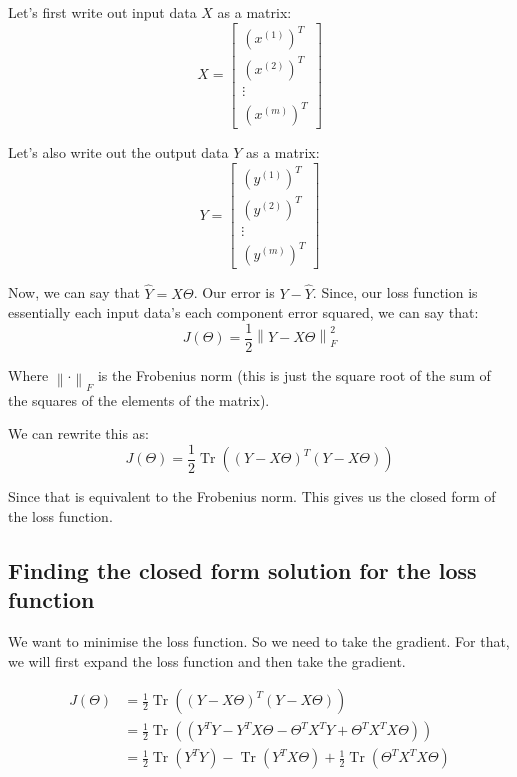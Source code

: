 \documentclass[a4paper]{article}
\DeclareMathOperator{\Tr}{Tr}
\newcommand{\norm}[1]{\left\lVert#1\right\rVert}
\begin{document}
Let's first write out input data $X$ as a matrix:
\begin{equation*}
    X = \begin{bmatrix}
        (x^{(1)})^T \\
        (x^{(2)})^T \\
        \vdots \\
        (x^{(m)})^T
    \end{bmatrix}
\end{equation*}

Let's also write out the output data $Y$ as a matrix:
\begin{equation*}
    Y = \begin{bmatrix}
        (y^{(1)})^T \\
        (y^{(2)})^T \\
        \vdots \\
        (y^{(m)})^T
    \end{bmatrix}
\end{equation*}

Now, we can say that $\hat{Y} = X\Theta$. Our error is $Y - \hat{Y}$. Since, our loss function is essentially each input data's each component error squared, we can say that:
\begin{equation*}
    J(\Theta) = \frac{1}{2} \norm{Y - X\Theta}^2_F
\end{equation*}

Where $\norm{\cdot}_F$ is the Frobenius norm (this is just the square root of the sum of the squares of the elements of the matrix).

We can rewrite this as:
\begin{equation*}
    J(\Theta) = \frac{1}{2} \Tr((Y - X\Theta)^T (Y - X\Theta))
\end{equation*}

Since that is equivalent to the Frobenius norm. This gives us the closed form of the loss function.

\subsection{Finding the closed form solution for the loss function}

We want to minimise the loss function. So we need to take the gradient. For that, we will first expand the loss function and then take the gradient.

\begin{align*}
    J(\Theta) &= \frac{1}{2} \Tr((Y - X\Theta)^T (Y - X\Theta)) \\
    &= \frac{1}{2} \Tr((Y^T Y - Y^TX\Theta - \Theta^TX^TY + \Theta^TX^TX\Theta))\\
    &= \frac{1}{2} \Tr(Y^T Y) - \Tr(Y^T X\Theta) + \frac{1}{2} \Tr(\Theta^TX^TX\Theta)
\end{align*}
\end{document}
